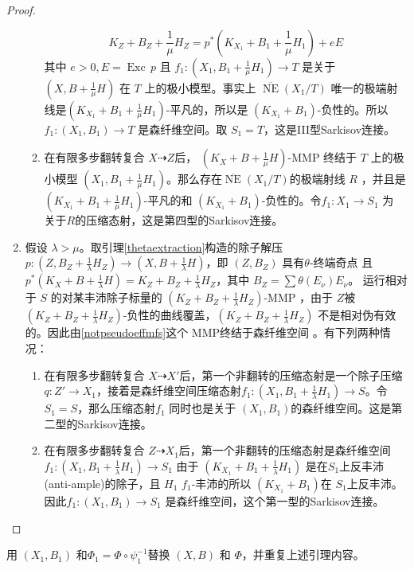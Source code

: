 \begin{proof}
\begin{enumerate}
\begin{enumerate}
            \[ K_Z+B_Z+\frac{1}{\mu}H_Z=p^*(K_{X_1}+B_1+\frac{1}{\mu}H_1)+eE \]
            其中 $ e>0 ,E=\operatorname{Exc}\,p$ 且  $f_{1}: (X_1,B_1+\frac{1}{\mu}H_1) \to T$ 是关于 $(X,B+\frac{1}{\mu}H)$ 在 $T$ 上的极小模型。事实上  $ \overline{\operatorname{NE}}(X_1/T) $ 唯一的极端射线是$ (K_{X_1}+B_1+\frac{1}{\mu}H_1) $-平凡的，所以是 $ (K_{X_1}+B_1) $-负性的。所以 $ f_1:(X_1, B_1)\to T $ 是森纤维空间。取 $ S_1=T $，这是III型Sarkisov连接。
      \item 在有限多步翻转复合 $ X\dashrightarrow Z $后，  $(K_{X}+B+\frac{1}{\mu}H)$-MMP 终结于 $T$ 上的极小模型 $ (X_1,B_1+\frac{1}{\mu}H_1) $。那么存在$ \overline{\operatorname{NE}}(X_1/T) $的极端射线 $R$ ，并且是 $ (K_{X_1}+B_1+\frac{1}{\mu}H_1) $-平凡的和 $ (K_{X_1}+B_1) $-负性的。令$ f_1:X_1\to S_1 $ 为 关于$R$的压缩态射，这是第四型的Sarkisov连接。
    \end{enumerate}
  \item 假设 $\lambda>\mu$。取引理\ref{thetaextraction}构造的除子解压 $ p:(Z,B_Z+\frac{1}{\lambda}H_Z)\to (X,B+\frac{1}{\lambda}H) $，即   $ (Z,B_Z) $ 具有$ \theta $-终端奇点 且 $ p^*(K_X+B+\frac{1}{\lambda}H)=K_Z+B_Z+\frac{1}{\lambda}H_Z $，其中 $ B_Z=\sum\theta(E_{\nu})E_\nu $。
    运行相对于 $S$ 的对某丰沛除子标量的 $ (K_Z+B_Z+\frac{1}{\lambda}H_Z) $-MMP ，由于 $Z$被 $ (K_Z+B_Z+\frac{1}{\lambda}H_Z) $-负性的曲线覆盖，$ (K_Z+B_Z+\frac{1}{\lambda}H_Z) $ 不是相对伪有效的。因此由\ref{notpseudoeffmfs}这个 MMP终结于森纤维空间 。有下列两种情况：
    \begin{enumerate}
      \item 在有限多步翻转复合 $ X\dashrightarrow X' $后，第一个非翻转的压缩态射是一个除子压缩 $ q:Z'\to X_1 $，接着是森纤维空间压缩态射$f_1:(X_1,B_1+\frac{1}{\lambda}H_1)\to S$。令$ S_1=S $，那么压缩态射$f_1$ 同时也是关于 $(X_1, B_1)$的森纤维空间。这是第二型的Sarkisov连接。
      \item 在有限多步翻转复合 $ Z\dashrightarrow X_1 $后，第一个非翻转的压缩态射是森纤维空间$f_1:(X_1,B_1+\frac{1}{\lambda}H_1)\to S_1$ 由于 $ (K_{X_1}+B_1+\frac{1}{\lambda}H_1) $ 是在$S_1$上反丰沛(anti-ample)的除子，且 $ H_1 $  $ f_1 $-丰沛的所以 $(K_{X_1}+B_1) $在 $S_1$上反丰沛。因此$ f_1:(X_1, B_1)\to S_1 $ 是森纤维空间，这个第一型的Sarkisov连接。
    \end{enumerate}
  \end{enumerate}
\end{proof}
用  $(X_1,B_1)$ 和$\Phi_{1}=\Phi\circ\psi_1^{-1}$替换 $(X,B)$ 和 $\Phi$，并重复上述引理内容。 
